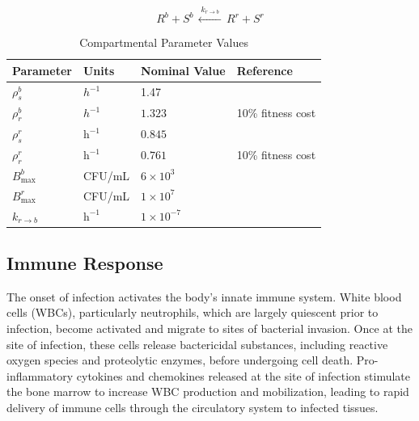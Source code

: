\documentclass[12pt, draftcls, onecolumn]{IEEEtran}
\begin{document}
\begin{equation}
R^{b} + S^{b}
\,
\xleftarrow{\;k_{r \to b}\;}
\,
R^{r} + S^{r}
\end{equation}



\begin{table}[H]
\centering
\large %
\renewcommand{\arraystretch}{1.35} %
\caption{Compartmental Parameter Values}\label{tab:Comparsms}
\vspace{0.5cm}
\begin{tabular}{l l l l}
\hline
\textbf{Parameter} & \textbf{Units} & \textbf{Nominal Value} & \textbf{Reference} \\
\hline
$\rho_s^{b}$ & $h^{-1}$ & 1.47 & \cite{VeraYunca2025}\\
$\rho_r^{b}$ & $h^{-1}$ & $1.323$ &  10\% fitness cost  \\
$\rho_{s}^{r}$         & $\text{h}^{-1}$     & $0.845$             & \cite{VeraYunca2025} \\
$\rho_{r}^{r}$         & $\text{h}^{-1}$     & $0.761$             & 10\% fitness cost\\
$B_{\max}^{b}$ & CFU/mL & $6 \times 10^3$ & \cite{nieman2022bacterial} \\
$B_{\max}^{r}$         & CFU/mL              & $1 \times 10^{7}$   & \cite{VeraYunca2025}\\
$k_{r \to b}$          & $\text{h}^{-1}$     & $1 \times 10^{-7}$ & \cite{Kostakioti2013} \\
\hline
\end{tabular}
\end{table}

 

\subsection{Immune Response}
The onset of infection activates the body's innate immune system. White blood cells (WBCs), particularly
neutrophils, which are largely quiescent prior to infection, become activated and migrate to sites of bacterial invasion.
Once at the site of infection, these cells release bactericidal substances, including reactive oxygen species and proteolytic enzymes,
before undergoing cell death. Pro-inflammatory cytokines and chemokines released at the site of infection stimulate
the bone marrow to increase WBC production and mobilization, leading to rapid delivery of immune cells through the circulatory
system to infected tissues.
\end{document}
